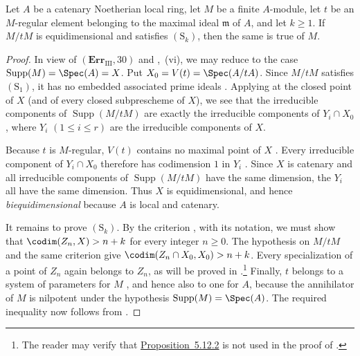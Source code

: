 \begin{proposition}[5.12.2]
\label{IV.5.12.2}
Let $A$ be a catenary Noetherian local ring, let $M$ be a finite
$A$-module, let $t$ be an $M$-regular element belonging to the
maximal ideal $\mathfrak m$ of $A$, and let $k\geq1$.  If $M/tM$
is equidimensional and satisfies $(\mathrm S_k)$, then the same is
true of $M$.
\end{proposition}

\begin{proof}
In view of $(\mathbf{Err}_{\mathrm{III}},30)$ and
,~(vi), we may reduce to the case $\operatorname{Supp}(M)=\Spec(A)=X$.
Put $X_0=V(t)=\Spec(A/tA)$.  Since $M/tM$ satisfies
$(\mathrm S_1)$, it has no embedded associated prime ideals
.  Applying  at the closed point of
$X$ (and of every closed subprescheme of $X$), we see that the
irreducible components of $\operatorname{Supp}(M/tM)$ are exactly
the irreducible components of $Y_i\cap X_0$, where
$Y_i$ $(1\leq i\leq r)$ are the irreducible components of $X$.

Because $t$ is $M$-regular, $V(t)$ contains no maximal point of
$X$ .  Every irreducible component of
$Y_i\cap X_0$ therefore has codimension $1$ in $Y_i$
.  Since $X$ is catenary and all irreducible
components of $\operatorname{Supp}(M/tM)$ have the same
dimension, the $Y_i$ all have the same dimension.  Thus $X$ is
equidimensional, and hence \emph{biequidimensional} because $A$ is local
and catenary.

It remains to prove $(\mathrm S_k)$.  By the criterion
, with its notation, we must show that $\codim(Z_n,X)>n+k$
for every integer $n\geq0$.  The hypothesis on $M/tM$ and the same
criterion give $\codim(Z_n\cap X_0,X_0)>n+k$.
Every specialization of a point of $Z_n$ again belongs to $Z_n$,
as will be proved in .\footnote{The reader may
verify that {\hyperref[IV.5.12.2]{Proposition~5.12.2}} is not used in the proof of
.}  Finally, $t$ belongs to a system of
parameters for $M$ , and hence also to one for
$A$, because the annihilator of $M$ is nilpotent under the
hypothesis $\operatorname{Supp}(M)=\Spec(A)$.  The required
inequality now follows from .
\end{proof}


